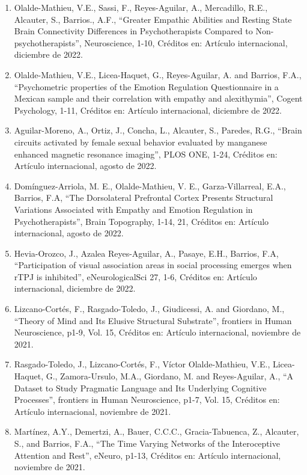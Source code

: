 \documentclass[12pt]{article}
\begin{document}
\begin{enumerate}
\item Olalde-Mathieu, V.E., Sassi, F., Reyes-Aguilar, A., Mercadillo, R.E., Alcauter, S., Barrios., A.F., “Greater 
Empathic Abilities and Resting State Brain Connectivity Differences in Psychotherapists Compared to Non-psychotherapists”, 
Neuroscience, 1-10, Créditos en: Artículo internacional, diciembre de 2022.

\item Olalde-Mathieu, V.E., Licea-Haquet, G., Reyes-Aguilar, A. and Barrios, F.A., “Psychometric properties of the Emotion Regulation 
Questionnaire in a Mexican sample and their correlation with empathy and alexithymia”, Cogent Psychology, 1-11, Créditos en: Artículo 
internacional, diciembre de 2022.

\item Aguilar-Moreno, A., Ortiz, J., Concha, L., Alcauter, S., Paredes, R.G., “Brain circuits activated by female sexual behavior 
evaluated by manganese enhanced magnetic resonance imaging”, PLOS ONE, 1-24, Créditos en: Artículo internacional, agosto de 2022.

\item Domínguez-Arriola, M. E., Olalde-Mathieu, V. E., Garza-Villarreal, E.A., Barrios, F.A, “The Dorsolateral Prefrontal Cortex 
Presents 
Structural Variations Associated with Empathy and Emotion Regulation in Psychotherapists”, Brain Topography, 1-14, 21, Créditos en: 
Artículo internacional, agosto de 2022.

\item Hevia-Orozco, J., Azalea Reyes-Aguilar, A., Pasaye, E.H., Barrios, F.A, “Participation of visual association areas in social 
processing emerges when rTPJ is inhibited”, eNeurologicalSci 27, 1-6, Créditos en: Artículo internacional, diciembre de 2022.

\item Lizcano-Cortés, F., Rasgado-Toledo, J., Giudicessi, A. and Giordano, M., “Theory of Mind and Its Elusive Structural Substrate”, 
frontiers in Human Neuroscience, p1-9, Vol. 15, Créditos en: Artículo internacional, noviembre de 2021.

\item Rasgado-Toledo, J., Lizcano-Cortés, F., Víctor Olalde-Mathieu, V.E., Licea-Haquet, G., Zamora-Ursulo, M.A., Giordano, M. and 
Reyes-Aguilar, A., “A Dataset to Study Pragmatic Language and Its Underlying Cognitive Processes”, frontiers in Human Neuroscience, 
p1-7, Vol. 15, Créditos en: Artículo internacional, noviembre de 2021.

\item Martínez, A.Y., Demertzi, A., Bauer, C.C.C., Gracia-Tabuenca, Z., Alcauter, S., and Barrios, F.A., “The Time Varying Networks of 
the Interoceptive Attention and Rest”, eNeuro, p1-13, Créditos en: Artículo internacional, noviembre de 2021.


\end{enumerate}
\end{document}
